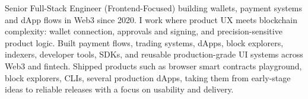 

\begin{cvparagraph}

Senior Full-Stack Engineer (Frontend-Focused) building wallets, payment systems and dApp flows in Web3 since 2020.
\newline
I work where product UX meets blockchain complexity: wallet connection, approvals and signing, and precision-sensitive product logic.
\newline
Built payment flows, trading systems, dApps, block explorers, indexers, developer tools, SDKs, and reusable production-grade UI systems across Web3 and fintech.
\newline
Shipped products such as browser smart contracts playground, block explorers, CLIs, several production dApps, taking them from early-stage ideas to reliable releases with a focus on usability and delivery.
\end{cvparagraph}
